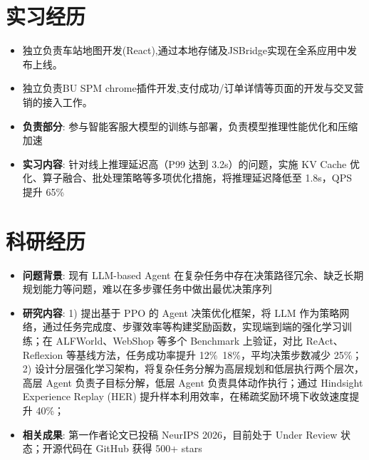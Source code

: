 \documentclass{cls/resume}
\begin{document}
\section{实习经历}
\begin{itemize}
    \item 独立负责车站地图开发(React),通过本地存储及JSBridge实现在全系应用中发布上线。
    \item 独立负责BU SPM chrome插件开发,支付成功/订单详情等页面的开发与交叉营销的接入工作。
\end{itemize}

\begin{itemize}
    \item \textbf{负责部分}: 参与智能客服大模型的训练与部署，负责模型推理性能优化和压缩加速
    \item \textbf{实习内容}: 针对线上推理延迟高（P99 达到 3.2s）的问题，实施 KV Cache 优化、算子融合、批处理策略等多项优化措施，将推理延迟降低至 1.8s，QPS 提升 65\%
\end{itemize}

\section{科研经历}
\begin{itemize}
  \item \textbf{问题背景}: 现有 LLM-based Agent 在复杂任务中存在决策路径冗余、缺乏长期规划能力等问题，难以在多步骤任务中做出最优决策序列
  \item \textbf{研究内容}: 1) 提出基于 PPO 的 Agent 决策优化框架，将 LLM 作为策略网络，通过任务完成度、步骤效率等构建奖励函数，实现端到端的强化学习训练；在 ALFWorld、WebShop 等多个 Benchmark 上验证，对比 ReAct、Reflexion 等基线方法，任务成功率提升 12\%~18\%，平均决策步数减少 25\%；
  2) 设计分层强化学习架构，将复杂任务分解为高层规划和低层执行两个层次，高层 Agent 负责子目标分解，低层 Agent 负责具体动作执行；通过 Hindsight Experience Replay (HER) 提升样本利用效率，在稀疏奖励环境下收敛速度提升 40\%；
  \item \textbf{相关成果}: 第一作者论文已投稿 NeurIPS 2026，目前处于 Under Review 状态；开源代码在 GitHub 获得 500+ stars
\end{itemize}
\end{document}
